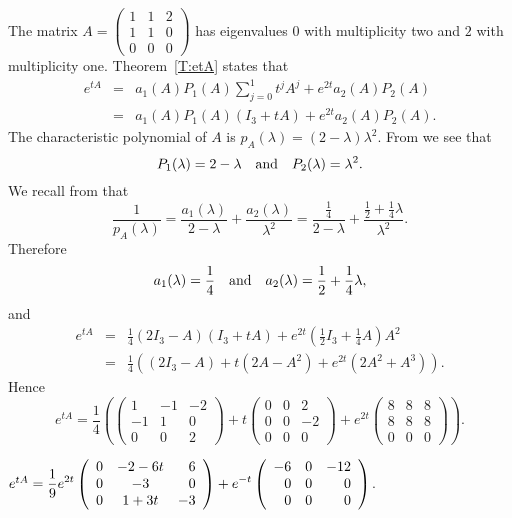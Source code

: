 \soln The matrix 
$A = \left(\begin{array}{rrr} 1 & 1 & 2\\ 1 & 1 & 0 \\ 0 & 0 & 0
\end{array}\right)$ has eigenvalues $0$ with multiplicity two and $2$ 
with multiplicity one. Theorem~\ref{T:etA} states that 
\begin{eqnarray*}
e^{tA} & = & a_1(A)P_1(A)\sum_{j=0}^1t^jA^j + e^{2t}a_2(A)P_2(A)\\
 & = & a_1(A)P_1(A)(I_3+tA) + e^{2t}a_2(A)P_2(A).
\end{eqnarray*}
The characteristic polynomial of $A$ is $p_A(\lambda) =(2-\lambda)\lambda^2$.
From  we see that
\[
P_1(\lambda) = 2-\lambda \quad\mbox{and}\quad P_2(\lambda) = \lambda^2.
\]
We recall from  that 
\[
\frac{1}{p_A(\lambda)} = \frac{a_1(\lambda)}{2-\lambda} + 
\frac{a_2(\lambda)}{\lambda^2} = \frac{\frac{1}{4}}{2-\lambda}
+ \frac{\frac{1}{2}+\frac{1}{4}\lambda}{\lambda^2}.
\]
Therefore
\[
a_1(\lambda) = \frac{1}{4} \quad\mbox{and}\quad a_2(\lambda) = \frac{1}{2}+\frac{1}{4}\lambda,
\]
and
\begin{eqnarray*}
e^{tA} & = & \frac{1}{4}(2I_3-A)(I_3+tA) + 
e^{2t}\left(\frac{1}{2}I_3+\frac{1}{4}A\right)A^2\\
& = & \frac{1}{4}\left((2I_3-A)+t(2A-A^2)+e^{2t}(2A^2+A^3)\right).
\end{eqnarray*}
Hence
\[
e^{tA}= \frac{1}{4}\left(\left(\begin{array}{rrr} 1 & -1 & -2\\ -1 & 1 & 0 
\\ 0 & 0 & 2\end{array}\right)+t\left(\begin{array}{rrr} 0 & 0 & 2\\ 0 & 0 & -2
\\ 0 & 0 & 0 \end{array}\right)+e^{2t}\left(\begin{array}{rrr} 8 & 8 & 8\\ 
8 & 8 & 8 \\ 0 & 0 & 0\end{array}\right)\right).
\]

\newpage
{} \ans $e^{tA}= \displaystyle\frac{1}{9}e^{2t}\left(\begin{array}{rcr} 
0 & -2-6t & 6\\ 0 & -3 & 0\\ 0 & 1+3t & -3\end{array}\right) 
+e^{-t}\left(\begin{array}{rrr} -6 & 0 & -12\\  0 & 0 & 0 \\ 0 & 0 & 0 
\end{array}\right)$.


